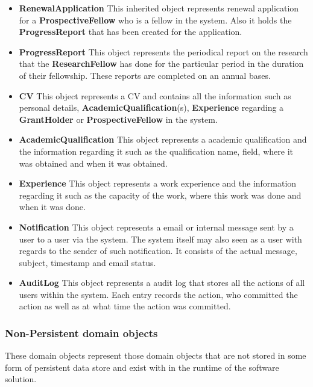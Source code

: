 \documentclass[12pt]{article}
\begin{document}
\begin{itemize}
\item \textbf{RenewalApplication}
This inherited object represents renewal application for a \textbf{ProspectiveFellow} who is a fellow in the system. Also it holds the \textbf{ProgressReport} that has been created for the application.

\item \textbf{ProgressReport}
This object represents the periodical report on the research that the \textbf{ResearchFellow} has done for the particular period in the duration of their fellowship. These reports are completed on an annual bases.

\item \textbf{CV}
This object represents a CV and contains all the information such as personal details, \textbf{AcademicQualification}(s), \textbf{Experience} regarding a \textbf{GrantHolder} or \textbf{ProspectiveFellow} in the system.

\item \textbf{AcademicQualification}
This object represents a academic qualification and the information regarding it such as the qualification name, field, where it was obtained and when it was obtained.

\item \textbf{Experience}
This object represents a work experience and the information regarding it such as the capacity of the work, where this work was done and when it was done.

\item \textbf{Notification}
This object represents a email or internal message sent by a user to a user via the system. The system itself may also seen as a user with regards to the sender of such notification. It consists of the actual message, subject, timestamp and email status. 

\item \textbf{AuditLog}
This object represents a audit log that stores all the actions of all users within the system. Each entry records the action, who committed the action as well as at what time the action was committed.


\end{itemize}

\newpage
\subsubsection{Non-Persistent domain objects}
These domain objects represent those domain objects that are not stored in some form of persistent data store and exist with in the runtime of the software solution.
\end{document}
